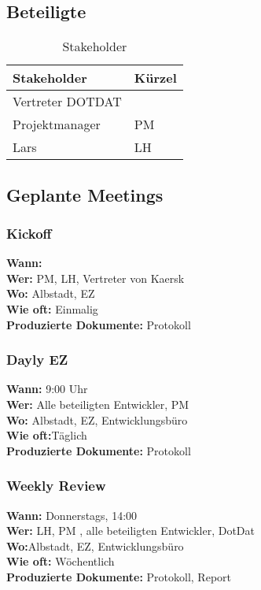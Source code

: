 \subsection{Beteiligte}
\begin{table}[H]
    \renewcommand{\arraystretch}{1.1}
    \begin{center}
        \begin{tabular}{l|l}
            \textbf{Stakeholder} & \textbf{Kürzel}\\\hline
            Vertreter DOTDAT & \\
            Projektmanager & PM\\
            Lars & LH\\
            
            
            
            
            
        \end{tabular}
    \end{center}
    \caption{Stakeholder}
\end{table}
\subsection{Geplante Meetings}
 
\subsubsection{Kickoff}
\textbf{Wann:} \\
\textbf{Wer:} PM, LH, Vertreter von Kaersk\\
\textbf{Wo:} Albstadt, EZ\\
\textbf{Wie oft:} Einmalig\\
\textbf{Produzierte Dokumente:} Protokoll


\subsubsection{Dayly EZ}
\textbf{Wann:} 9:00 Uhr\\
\textbf{Wer:} Alle beteiligten Entwickler, PM\\
\textbf{Wo:} Albstadt, EZ, Entwicklungsbüro\\
\textbf{Wie oft:}Täglich\\
\textbf{Produzierte Dokumente:} Protokoll

\subsubsection{Weekly Review}
\textbf{Wann:}  Donnerstags, 14:00\\
\textbf{Wer:} LH, PM , alle beteiligten Entwickler, DotDat\\
\textbf{Wo:}Albstadt, EZ, Entwicklungsbüro\\
\textbf{Wie oft:} Wöchentlich\\
\textbf{Produzierte Dokumente:} Protokoll, Report

